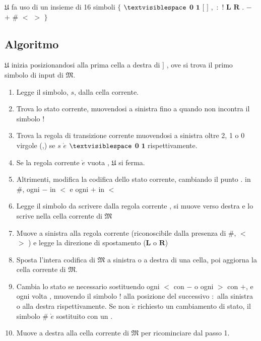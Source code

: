 \documentclass[a4paper]{article}
\theoremstyle{plain}
\theoremstyle{definition}
\begin{document}
$\mathfrak{U}$ fa uso di un insieme di 16 simboli 
$\{$ $\mathbf{\textvisiblespace}$  $\mathbf{0}$  $\mathbf{1}$ $\mathbf{[}$ 
$\mathbf{]}$ $\mathbf{,}$ $\mathbf{:}$ $\mathbf{!}$ $\mathbf{L}$ $\mathbf{R}$
$\mathbf{.}$ $\mathbf{-}$ $\mathbf{+}$ $\mathbf{\#}$ $\mathbf{<}$ $\mathbf{>}$
$\}$ 

\subsection{Algoritmo}
\label{sec:Impl}

$\mathfrak{U}$ inizia posizionandosi alla prima cella a destra di $\mathbf{]}$ , ove si trova il primo
simbolo di input di $\mathfrak{M}$.

\begin{enumerate}
	\item Legge il simbolo, $s$, dalla cella corrente.
	\item Trova lo stato corrente, muovendosi a sinistra fino a quando non incontra il 
	simbolo $\mathbf{!}$
	\item Trova la regola di transizione corrente muovendosi a sinistra oltre 2, 1 o 0 virgole (,)
	se $s$ $\grave{e}$ $\mathbf{\textvisiblespace}$  $\mathbf{0}$  $\mathbf{1}$ rispettivamente.
	\item Se la regola corrente $\grave{e}$ vuota , $\mathfrak{U}$ si ferma.
	\item Altrimenti, modifica la codifica dello stato corrente, 
	cambiando il punto $\mathbf{.}$ in $\mathbf{\#}$, ogni $\mathbf{-}$ in $\mathbf{<}$ e
	ogni $\mathbf{+}$ in $\mathbf{<}$
	\item Legge il simbolo da scrivere dalla regola corrente , 
	si muove verso destra e lo scrive nella cella corrente di $\mathfrak{M}$
	\item Muove a sinistra alla regola corrente (riconoscibile dalla presenza di $\mathbf{\#}$, 
	$\mathbf{<}$ $\mathbf{>}$ ) e legge la direzione di spostamento ($\mathbf{L}$ o $\mathbf{R}$)
	\item Sposta l'intera codifica di $\mathfrak{M}$ a sinistra o a destra di una cella, 
	poi aggiorna la cella corrente di $\mathfrak{M}$.
	\item Cambia lo stato se necessario sostituendo ogni $\mathbf{<}$ con $\mathbf{-}$ o ogni
	$\mathbf{>}$ con $\mathbf{+}$, e ogni volta , muovendo il simbolo $\mathbf{!}$ alla
	posizione del successivo $\mathbf{:}$ alla sinistra o alla destra rispettivamente. 
	Se non $\grave{e}$ richiesto un cambiamento di stato, il simbolo $\mathbf{\#}$ $\grave{e}$ 
	sostituito con un $\mathbf{.}$
	\item Muove a destra alla cella corrente di $\mathfrak{M}$ per ricominciare dal passo 1.

\end{enumerate}

	
	
\end{document}
